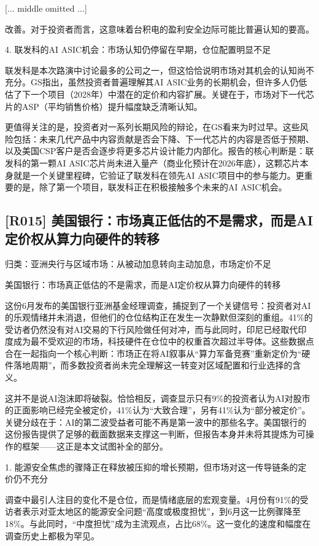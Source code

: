 \documentclass[11pt]{ctexart}
\begin{document}
[... middle omitted ...]

改善。对于投资者而言，这意味着台积电的盈利安全边际可能比普遍认知的要高。

4. 联发科的AI ASIC机会：市场认知仍停留在早期，仓位配置明显不足

联发科是本次路演中讨论最多的公司之一，但这恰恰说明市场对其机会的认知尚不充分。GS指出，虽然投资者普遍理解其AI ASIC业务的长期机会，但许多人仍低估了下一个项目（2028年）中潜在的定价和内容扩展。关键在于，市场对下一代芯片的ASP（平均销售价格）提升幅度缺乏清晰认知。

更值得关注的是，投资者对一系列长期风险的辩论，在GS看来为时过早。这些风险包括：未来几代产品中内容贡献是否会下降、下一代芯片的内容是否低于预期、以及美国CSP客户是否会逐步将更多芯片设计能力内部化。报告的核心判断是：联发科的第一颗AI ASIC芯片尚未进入量产（商业化预计在2026年底），这颗芯片本身就是一个关键里程碑，它验证了联发科在领先AI ASIC项目中的参与能力。更重要的是，除了第一个项目，联发科正在积极接触多个未来的AI ASIC机会。

\subsection{[R015] 美国银行：市场真正低估的不是需求，而是AI定价权从算力向硬件的转移}
{\small\color{refgray}归类：亚洲央行与区域市场：从被动加息转向主动加息，市场定价不足}

美国银行：市场真正低估的不是需求，而是AI定价权从算力向硬件的转移

这份6月发布的美国银行亚洲基金经理调查，捕捉到了一个关键信号：投资者对AI的乐观情绪并未消退，但他们的仓位结构正在发生一次静默但深刻的重组。41\%的受访者仍然没有对AI交易的下行风险做任何对冲，而与此同时，印尼已经取代印度成为最不受欢迎的市场，科技硬件在仓位中的权重首次超过半导体。这些数据点合在一起指向一个核心判断：市场正在将AI叙事从“算力军备竞赛”重新定价为“硬件落地周期”，而多数投资者尚未完全理解这一转变对区域配置和行业选择的含义。

这并不是说AI泡沫即将破裂。恰恰相反，调查显示只有9\%的投资者认为AI对股市的正面影响已经完全被定价，41\%认为“大致合理”，另有41\%认为“部分被定价”。关键分歧在于：AI的第二波受益者可能不再是第一波中的那些名字。美国银行的这份报告提供了足够的截面数据来支撑这一判断，但报告本身并未将其提炼为可操作的框架——这正是本文试图补全的部分。

1. 能源安全焦虑的骤降正在释放被压抑的增长预期，但市场对这一传导链条的定价仍不充分

调查中最引人注目的变化不是仓位，而是情绪底层的宏观变量。4月份有91\%的受访者表示对亚太地区的能源安全问题“高度或极度担忧”，到6月这一比例骤降至18\%。与此同时，“中度担忧”成为主流观点，占比68\%。这一变化的速度和幅度在调查历史上都极为罕见。
\end{document}
